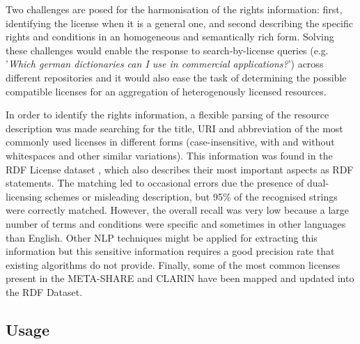 \documentclass[11pt]{article}
\begin{document}
Two challenges are posed for the harmonisation of the rights information: first, identifying the license when it is a general one, and second describing the specific rights and conditions in an homogeneous and semantically rich form. Solving these challenges would enable the response to search-by-license queries (e.g. '\textit{Which german dictionaries can I use in commercial applications?}') across different repositories and it would also ease the task of determining the possible compatible licenses for an aggregation of heterogenously licensed resources.

In order to identify the rights information, a flexible parsing of the resource description was made searching for the title, URI and abbreviation of the most commonly used licenses in different forms (case-insensitive, with and without whitespaces and other similar variations). This information was found in the RDF License dataset \cite{rdflicense}, which also describes their most important aspects as RDF statements. The matching led to occasional errors due the presence of dual-licensing schemes or misleading description, but 95\% of the recognised strings were correctly matched. %
However, the overall recall was very low because a large number of terms and conditions were specific and sometimes in other languages than English. Other NLP techniques might be applied for extracting this information but this sensitive information requires a good precision rate that existing algorithms do not provide. %
Finally, some of the most common licenses present in the META-SHARE and CLARIN have been mapped and updated into the RDF Dataset.



\subsection{Usage}
\end{document}
